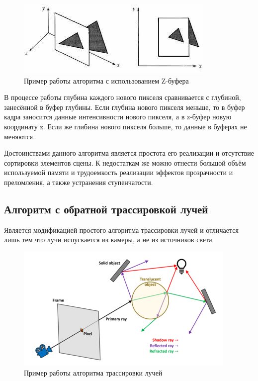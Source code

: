 \documentclass[12pt,a4paper,oneside]{report}
\begin{document}
    			\begin{figure}[h]
					\centering
					\includegraphics[scale=0.6]{zbuf}
					\caption{Пример работы алгоритма с использованием Z-буфера}
				\end{figure}
    			
				\quad В процессе работы глубина каждого нового пикселя сравнивается с глубиной, занесённой в буфер глубины. Если глубина нового пикселя меньше, то в буфер кадра заносится данные интенсивности нового пикселя, а в z-буфер новую координату z. Если же глибина нового пикселя больше, то данные в буферах не меняются.
				
				\quad Достоинствами данного алгоритма является простота его реализации и отсутствие сортировки элементов сцены. К недостаткам же можно отнести большой объём используемой памяти и трудоемкость реализации эффектов прозрачности и преломления, а также устранения ступенчатости.
			\subsection{Алгоритм с обратной трассировкой лучей}
				\quad Является модификацией простого алгоритма трассировки лучей и отличается лишь тем что лучи испускается из камеры, а не из источников света.
				
				\begin{figure}[h]
					\centering
					\includegraphics[scale=0.6]{trace}
					\caption{Пример работы алгоритма трассировки лучей}
				\end{figure}
				
\end{document}
